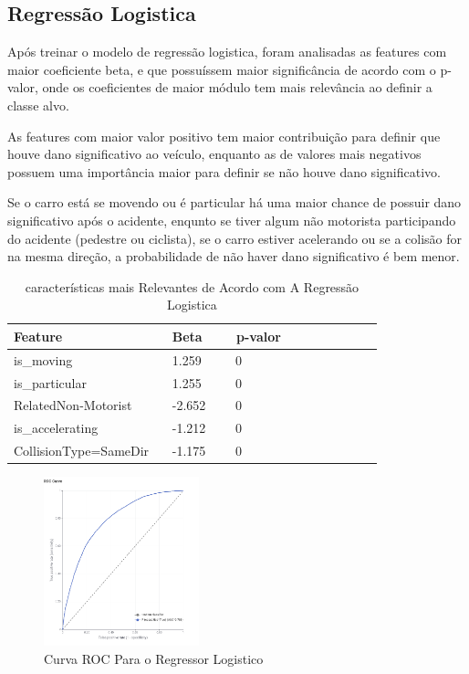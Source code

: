 \documentclass[conference]{IEEEtran}
\begin{document}
\subsection{Regressão Logistica}
Após treinar o modelo de regressão logistica, foram analisadas as features com maior coeficiente beta, e que possuíssem maior 
significância de acordo com o p-valor, onde os coeficientes de maior módulo tem mais relevância ao definir a classe alvo.

As features com maior valor positivo tem maior contribuição para definir que houve
dano significativo ao veículo, enquanto as de valores mais negativos possuem uma importância maior para definir se não houve dano significativo.

Se o carro está se movendo ou é particular há uma maior chance de possuir dano significativo após o acidente, enqunto se tiver algum não motorista
participando do acidente (pedestre ou ciclista), se o carro estiver acelerando ou se a colisão for na mesma direção, a probabilidade de 
não haver dano significativo é bem menor.

\begin{table}[!ht]
    \centering
    \caption{características mais Relevantes de Acordo com A Regressão Logistica}
    \begin{tabular}{|l|l|l|l|l|l|l|l|l|l|}
    \hline
        Feature~ & Beta~ & ~p-valor  \\ \hline
        is\_moving~ &  1.259~ & ~0  \\ \hline
        is\_particular~ & 1.255~ & ~0  \\ \hline
        RelatedNon-Motorist ~ & -2.652~ & ~0  \\ \hline
        is\_accelerating ~ & -1.212 ~ & ~0  \\ \hline
        CollisionType=SameDir ~ & -1.175 ~ & ~0  \\ \hline
    \end{tabular}
\end{table}



\begin{figure}[H]
    \centerline{\includegraphics[width=0.4\textwidth]{Images/roc-curve-regressor.png}}
    \caption{\label{fig:decision-tree} Curva ROC Para o Regressor Logistico}
\end{figure}
\end{document}
